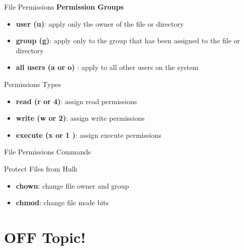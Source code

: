\documentclass{beamer}
\begin{document}
\begin{frame}{File Permissions}
	\textbf{Permission Groups}

	
	\begin{itemize}

			\item {
					\textbf{user (u)}: apply only the owner of the file or directory
					\pause
					}
			\item {
					\textbf{group (g)}: apply only to the group that has been assigned to the file or directory
					\pause
					}
			\item {
					\textbf{all users (a or o) }:  apply to all other users on the system
					\pause
			}

	\end{itemize}
	
    Permissions Types
	\begin{itemize}

	    \item {
	        \textbf{read (r or 4)}: assign read permissions
	        \pause
	        }
	    
	    \item {
	        \textbf{write (w or 2)}: assign write permissions
	        \pause
	        }
	        
	   \item {
	        \textbf{execute (x or 1 )}: assign execute permissions
	        \pause
	        }
	        
	\end{itemize}
	
\end{frame}
\begin{frame}{File Permissions Commands}
    
	\alert{ Protect Files from Hulk} 
	
	\begin{itemize}
	
	    	\item {
				\textbf{chown}: change file owner and group
				\pause
				}
				
		\item {
				\textbf{chmod}: change file mode bits
				\pause
				}
	
	
	\end{itemize}
	
\end{frame}

\section{OFF Topic!}
\end{document}
